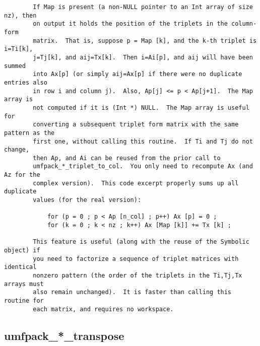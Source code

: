 {\begin{verbatim}
        If Map is present (a non-NULL pointer to an Int array of size nz), then
        on output it holds the position of the triplets in the column-form
        matrix.  That is, suppose p = Map [k], and the k-th triplet is i=Ti[k],
        j=Tj[k], and aij=Tx[k].  Then i=Ai[p], and aij will have been summed
        into Ax[p] (or simply aij=Ax[p] if there were no duplicate entries also
        in row i and column j).  Also, Ap[j] <= p < Ap[j+1].  The Map array is
        not computed if it is (Int *) NULL.  The Map array is useful for
        converting a subsequent triplet form matrix with the same pattern as the
        first one, without calling this routine.  If Ti and Tj do not change,
        then Ap, and Ai can be reused from the prior call to
        umfpack_*_triplet_to_col.  You only need to recompute Ax (and Az for the
        complex version).  This code excerpt properly sums up all duplicate
        values (for the real version):

            for (p = 0 ; p < Ap [n_col] ; p++) Ax [p] = 0 ;
            for (k = 0 ; k < nz ; k++) Ax [Map [k]] += Tx [k] ;

        This feature is useful (along with the reuse of the Symbolic object) if
        you need to factorize a sequence of triplet matrices with identical
        nonzero pattern (the order of the triplets in the Ti,Tj,Tx arrays must
        also remain unchanged).  It is faster than calling this routine for
        each matrix, and requires no workspace.
\end{verbatim}
}

\newpage
\subsection{umfpack\_*\_transpose}


